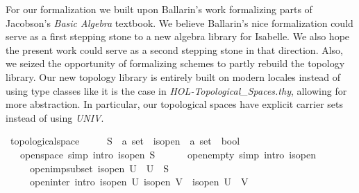 \documentclass[12pt]{scrartcl}
\begin{document}
For our formalization we built upon Ballarin's work \cite{ballarin20} formalizing parts of Jacobson's \textit{Basic Algebra} textbook. We believe Ballarin's nice formalization could serve as a first stepping stone to a new algebra library for Isabelle. We also hope the present work could serve as a second stepping stone in that direction. Also, we seized the opportunity of formalizing schemes to partly rebuild the topology library. Our new topology library is entirely built on modern locales instead of using type classes like it is the case in \textit{HOL-Topological\_Spaces.thy}, allowing for more abstraction. In particular, our topological spaces have explicit carrier sets instead of using \textit{UNIV}. 
\begin{isabelle}
\isamarkupfalse%
\ topological{\isacharunderscore}{\kern0pt}space\ {\isacharequal}{\kern0pt}\ \isanewline
\ \ \ S\ {\isacharcolon}{\kern0pt}{\isacharcolon}{\kern0pt}\ {\isachardoublequoteopen}{\isacharprime}{\kern0pt}a\ set{\isachardoublequoteclose}\ \ is{\isacharunderscore}{\kern0pt}open\ {\isacharcolon}{\kern0pt}{\isacharcolon}{\kern0pt}\ {\isachardoublequoteopen}{\isacharprime}{\kern0pt}a\ set\ {\isasymRightarrow}\ bool{\isachardoublequoteclose}\isanewline
\ \ \ open{\isacharunderscore}{\kern0pt}space\ {\isacharbrackleft}{\kern0pt}simp{\isacharcomma}{\kern0pt}\ intro{\isacharbrackright}{\kern0pt}{\isacharcolon}{\kern0pt}\ {\isachardoublequoteopen}is{\isacharunderscore}{\kern0pt}open\ S{\isachardoublequoteclose}\ \isanewline
\ \ \ \ \ open{\isacharunderscore}{\kern0pt}empty\ {\isacharbrackleft}{\kern0pt}simp{\isacharcomma}{\kern0pt}\ intro{\isacharbrackright}{\kern0pt}{\isacharcolon}{\kern0pt}\ {\isachardoublequoteopen}is{\isacharunderscore}{\kern0pt}open\ {\isacharbraceleft}{\kern0pt}{\isacharbraceright}{\kern0pt}{\isachardoublequoteclose}\ \isanewline
\ \ \ \ \ open{\isacharunderscore}{\kern0pt}imp{\isacharunderscore}{\kern0pt}subset{\isacharcolon}{\kern0pt}\ {\isachardoublequoteopen}is{\isacharunderscore}{\kern0pt}open\ U\ {\isasymLongrightarrow}\ U\ {\isasymsubseteq}\ S{\isachardoublequoteclose}\isanewline
\ \ \ \ \ open{\isacharunderscore}{\kern0pt}inter\ {\isacharbrackleft}{\kern0pt}intro{\isacharbrackright}{\kern0pt}{\isacharcolon}{\kern0pt}\ {\isachardoublequoteopen}{\isasymlbrakk}is{\isacharunderscore}{\kern0pt}open\ U{\isacharsemicolon}{\kern0pt}\ is{\isacharunderscore}{\kern0pt}open\ V{\isasymrbrakk}\ {\isasymLongrightarrow}\ is{\isacharunderscore}{\kern0pt}open\ {\isacharparenleft}{\kern0pt}U\ {\isasyminter}\ V{\isacharparenright}{\kern0pt}{\isachardoublequoteclose}\ \isanewline

\end{isabelle}
\end{document}
